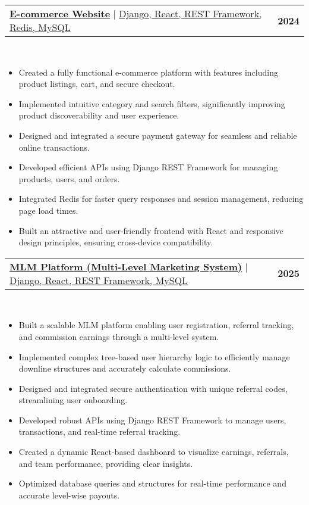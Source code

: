 \documentclass[letterpaper,11pt]{article}
\makeatletter
\newcommand{\resumeItem}[1]{
 \item\small{
{#1 \vspace{-2pt}}
 }
}
\newcommand{\resumeProjectHeading}[2]{
\item
\begin{tabular*}{1.001\textwidth}{l@{\extracolsep{\fill}}r}
 \small#1 & \textbf{\small #2}\\
\end{tabular*}\vspace{-7pt}
}
\newcommand{\resumeItemListStart}{\begin{itemize}}
\newcommand{\resumeItemListEnd}{\end{itemize}\vspace{-5pt}}
\makeatother
\begin{document}
 \resumeProjectHeading
 {\href{}{\textbf{\large{E-commerce Website}}} $|$ \large{\underline{Django, React, REST Framework, Redis, MySQL}}}{2024}\\
 \resumeItemListStart
 \resumeItem{\normalsize{Created a fully functional e-commerce platform with features including product listings, cart, and secure checkout.}}
 \resumeItem{\normalsize{Implemented intuitive category and search filters, significantly improving product discoverability and user experience.}}
 \resumeItem{\normalsize{Designed and integrated a secure payment gateway for seamless and reliable online transactions.}}
 \resumeItem{\normalsize{Developed efficient APIs using Django REST Framework for managing products, users, and orders.}}
 \resumeItem{\normalsize{Integrated Redis for faster query responses and session management, reducing page load times.}}
 \resumeItem{\normalsize{Built an attractive and user-friendly frontend with React and responsive design principles, ensuring cross-device compatibility.}}
 \resumeItemListEnd
 \vspace{-13pt}
\resumeProjectHeading
 {\href{}{\textbf{\large{MLM Platform (Multi-Level Marketing System)}}} $|$ \large{\underline{Django, React, REST Framework, MySQL}}}{2025}\\
 \resumeItemListStart
\resumeItem{\normalsize{Built a scalable MLM platform enabling user registration, referral tracking, and commission earnings through a multi-level system.}}
\resumeItem{\normalsize{Implemented complex tree-based user hierarchy logic to efficiently manage downline structures and accurately calculate commissions.}}
\resumeItem{\normalsize{Designed and integrated secure authentication with unique referral codes, streamlining user onboarding.}}
\resumeItem{\normalsize{Developed robust APIs using Django REST Framework to manage users, transactions, and real-time referral tracking.}}
\resumeItem{\normalsize{Created a dynamic React-based dashboard to visualize earnings, referrals, and team performance, providing clear insights.}}
\resumeItem{\normalsize{Optimized database queries and structures for real-time performance and accurate level-wise payouts.}}
 \resumeItemListEnd
 \vspace{-13pt}
\end{document}
